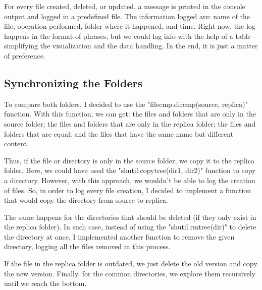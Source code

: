 \documentclass{article}
\begin{document}
For every file created, deleted, or updated, a message is printed in the console output and logged in a predefined file. The information logged are: name of the file, operation performed, folder where it happened, and time. 
Right now, the log happens in the format of phrases, but we could log info with the help of a table - simplifying the visualization and the data handling. In the end, it is just a matter of preference.

\subsection{Synchronizing the Folders}


To compare both folders, I decided to use the "filecmp.dircmp(source, replica)" function. With this function, we can get: the files and folders that are only in the source folder; the files and folders that are only in the replica folder; the files and folders that are equal; and the files that have the same name but different content.

Thus, if the file or directory is only in the source folder, we copy it to the replica folder. Here, we could have used the "shutil.copytree(dir1, dir2)" function to copy a directory. However, with this approach, we wouldn't be able to log the creation of files. So, in order to log every file creation, I decided to implement a function that would copy the directory from source to replica.

The same happens for the directories that should be deleted (if they only exist in the replica folder). In such case, instead of using the "shutil.rmtree(dir)" to delete the directory at once, I implemented another function to remove the given directory, logging all the files removed in this process.

If the file in the replica folder is outdated, we just delete the old version and copy the new version. Finally, for the common directories, we explore them recursively until we reach the bottom.
\end{document}
